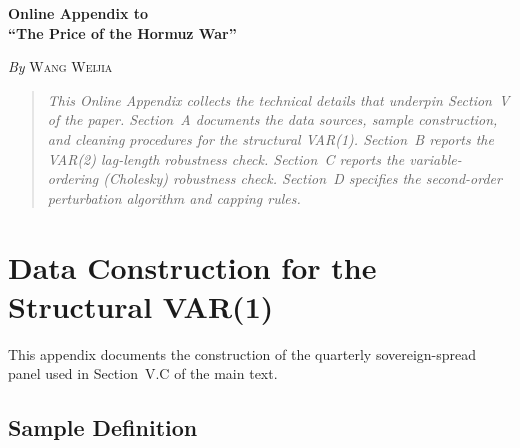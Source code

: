 \documentclass[12pt,a4paper]{article}
\begin{document}
\begin{center}
{\large\bfseries Online Appendix to\\[0.4em]
``The Price of the Hormuz War''\par}
\vspace{0.9em}
{\normalsize \textit{By} \textsc{Wang Weijia}\par}
\end{center}
\vspace{0.9em}

\begin{quote}
\itshape
This Online Appendix collects the technical details that underpin
Section~V of the paper. Section~A documents the data sources, sample
construction, and cleaning procedures for the structural VAR(1).
Section~B reports the VAR(2) lag-length robustness check.
Section~C reports the variable-ordering (Cholesky) robustness check.
Section~D specifies the second-order perturbation algorithm and capping rules.
\end{quote}

\vspace{1em}
\tableofcontents
\newpage
\setcounter{page}{1}


\section{Data Construction for the Structural VAR(1)}
\label{app:data}

This appendix documents the construction of the quarterly sovereign-spread panel used in Section~V.C of the main text.

\subsection{Sample Definition}
\end{document}
